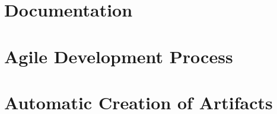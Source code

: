 \documentclass{article}
\begin{document}
\section{Documentation}




\section{Agile Development Process}



\section{Automatic Creation of Artifacts}


\end{document}
